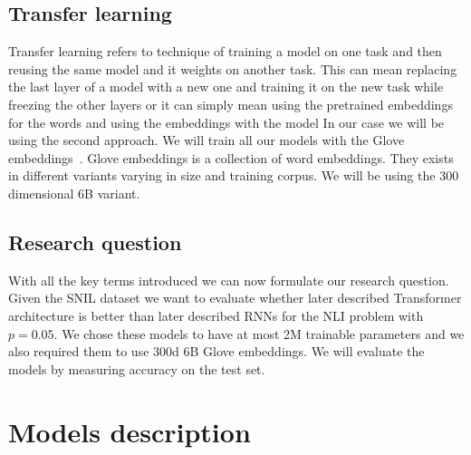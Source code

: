 \documentclass{article}
\begin{document}
    \subsection{Transfer learning}
    Transfer learning refers to technique of training a model on one task and then reusing the same model and it weights on another task.
    This can mean replacing the last layer of a model with a new one and training it on the new task while freezing the other layers or it can simply mean using the pretrained embeddings for the words and using the embeddings with the model
    In our case we will be using the second approach. We will train all our models with the Glove embeddings~\cite{penningtonGloVeGlobalVectors2014}.
    Glove embeddings is a collection of word embeddings.
    They exists in different variants varying in size and training corpus.
    We will be using the 300 dimensional 6B variant.


    \subsection{Research question}
    With all the key terms introduced we can now formulate our research question.
    Given the SNIL dataset we want to evaluate whether later described Transformer architecture is better than later described RNNs for the NLI problem with $p=0.05$.
    We chose these models to have at most 2M trainable parameters and we also required them to use 300d 6B Glove embeddings.
    We will evaluate the models by measuring accuracy on the test set.


    \section{Models description}
\end{document}
